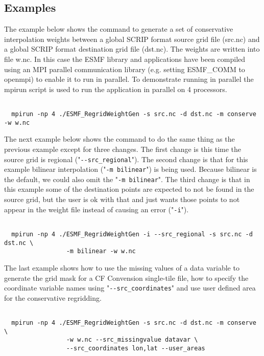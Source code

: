 \subsection{Examples}

The example below shows the command to generate a set of conservative interpolation weights between a global
SCRIP format source grid file (src.nc) and a global SCRIP format destination grid file (dst.nc). The weights
are written into file w.nc. In this case the
ESMF library and applications have been compiled using an MPI parallel communication library
(e.g. setting ESMF\_COMM to openmpi) to enable it to run in parallel. To demonstrate running in parallel
the mpirun script is used to run the application in parallel on 4 processors.

\begin{verbatim}

  mpirun -np 4 ./ESMF_RegridWeightGen -s src.nc -d dst.nc -m conserve -w w.nc

\end{verbatim}

The next example below shows the command to do the same thing as the previous example except for three changes. The first
change is this time the source grid is regional ("{\tt \verb+--+src\_regional}"). The second change is that
for this example bilinear interpolation ("{\tt -m bilinear}") is being used. Because bilinear is the default, we could also
omit the "{\tt -m bilinear}". The third change is that in this example some of the destination points are expected to
not be found in the source grid, but the user is ok with that and just wants those points to not appear in the weight file instead of causing an error ("{\tt -i}").

\begin{verbatim}

  mpirun -np 4 ./ESMF_RegridWeightGen -i --src_regional -s src.nc -d dst.nc \
                 -m bilinear -w w.nc

\end{verbatim}

The last example shows how to use the missing values of a data variable to generate the
grid mask for a CF Convension single-tile file, how to specify the coordinate variable names
using "{\tt \verb+--+src\_coordinates}"
 and use user defined area for the conservative regridding.

\begin{verbatim}

  mpirun -np 4 ./ESMF_RegridWeightGen -s src.nc -d dst.nc -m conserve \
                 -w w.nc --src_missingvalue datavar \
                 --src_coordinates lon,lat --user_areas

\end{verbatim}

